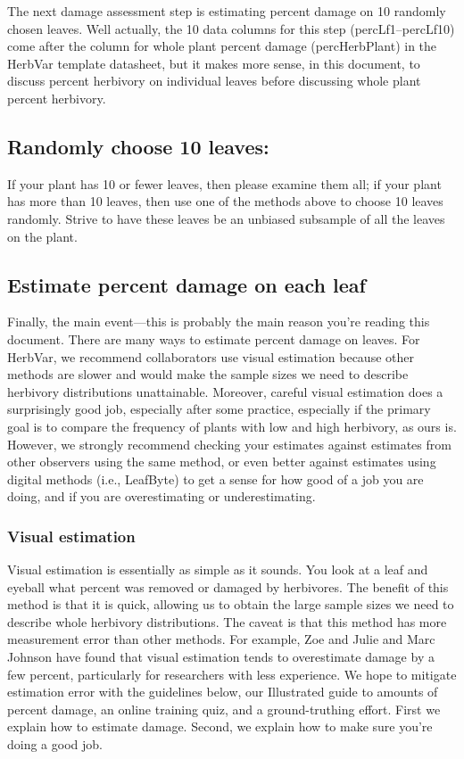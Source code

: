 \documentclass[
  letterpaper,
  oneside,
  open=any]{scrbook}
\begin{document}
The next damage assessment step is estimating percent damage on 10
randomly chosen leaves. Well actually, the 10 data columns for this step
(percLf1--percLf10) come after the column for whole plant percent damage
(percHerbPlant) in the HerbVar template datasheet, but it makes more
sense, in this document, to discuss percent herbivory on individual
leaves before discussing whole plant percent herbivory.

\subsection{Randomly choose 10 leaves:}\label{randomly-choose-10-leaves}

If your plant has 10 or fewer leaves, then please examine them all; if
your plant has more than 10 leaves, then use one of the methods above to
choose 10 leaves randomly. Strive to have these leaves be an unbiased
subsample of all the leaves on the plant.

\subsection{Estimate percent damage on each
leaf}\label{estimate-percent-damage-on-each-leaf}

Finally, the main event---this is probably the main reason you're
reading this document. There are many ways to estimate percent damage on
leaves. For HerbVar, we recommend collaborators use visual estimation
because other methods are slower and would make the sample sizes we need
to describe herbivory distributions unattainable. Moreover, careful
visual estimation does a surprisingly good job, especially after some
practice, especially if the primary goal is to compare the frequency of
plants with low and high herbivory, as ours is. However, we strongly
recommend checking your estimates against estimates from other observers
using the same method, or even better against estimates using digital
methods (i.e., LeafByte) to get a sense for how good of a job you are
doing, and if you are overestimating or underestimating.

\subsubsection{Visual estimation}\label{visual-estimation}

Visual estimation is essentially as simple as it sounds. You look at a
leaf and eyeball what percent was removed or damaged by herbivores. The
benefit of this method is that it is quick, allowing us to obtain the
large sample sizes we need to describe whole herbivory distributions.
The caveat is that this method has more measurement error than other
methods. For example, Zoe and Julie and Marc Johnson have found that
visual estimation tends to overestimate damage by a few percent,
particularly for researchers with less experience. We hope to mitigate
estimation error with the guidelines below, our Illustrated guide to
amounts of percent damage, an online training quiz, and a
ground-truthing effort. First we explain how to estimate damage. Second,
we explain how to make sure you're doing a good job.
\end{document}
